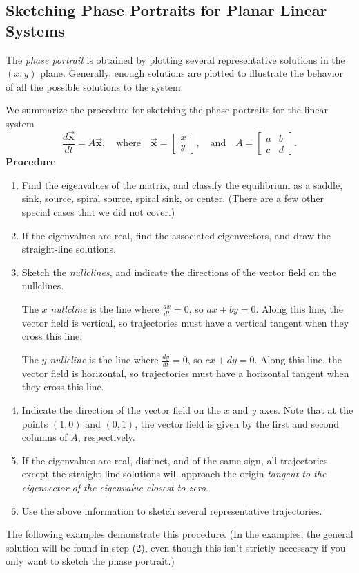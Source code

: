 \documentclass[reqno]{immbook}
\newcommand{\BX}{\vec{\textbf{x}}}
\numberwithin{equation}{chapter}
\numberwithin{question}{section}
\numberwithin{theorem}{chapter}
\numberwithin{figure}{chapter}
\theoremstyle{definition}
\begin{document}
\subsection*{Sketching Phase Portraits for Planar Linear Systems}

\noindent
The \emph{phase portrait} is obtained by plotting several
representative solutions in the $(x,y)$ plane.
Generally, enough solutions are plotted to illustrate
the behavior of all the possible solutions to the system.

We summarize the procedure for sketching the phase portraits for
the linear system
\[
    \frac{d\BX}{dt} = A\BX, \quad \textrm{where} \quad
    \BX=\begin{bmatrix} x \\ y \end{bmatrix},
    \quad \textrm{and} \quad
    A = \begin{bmatrix} a & b \\ c & d \end{bmatrix}.
\]
\noindent
\textbf{Procedure}
\begin{enumerate}
\item
Find the eigenvalues of the matrix, and classify the equilibrium as a
saddle, sink, source, spiral source, spiral sink, or center.
(There are a few other special cases that we did not cover.)
\item
If the eigenvalues are real, find the associated eigenvectors, and
draw the straight-line solutions.
\item  Sketch the \emph{nullclines}, and indicate the
directions of the vector field on the nullclines.

The $x$ \emph{nullcline} is the line where $\frac{dx}{dt}=0$,
so $ax+by=0$. Along this line, the vector field is vertical, so trajectories
must have a vertical tangent when they cross this line.

The $y$ \emph{nullcline} is the line where $\frac{dy}{dt}=0$, so
$cx+dy=0$.  Along this line, the vector field is horizontal, so
trajectories must have a horizontal tangent when they cross this line.
 
\item Indicate the direction of the vector field on the $x$ and $y$ axes.
Note that at the points $(1,0)$ and $(0,1)$, the
vector field is given by the first and second columns of $A$, respectively.
\item
If the eigenvalues are real, distinct, and of the same sign,
all trajectories except the straight-line solutions
will approach the origin \emph{tangent to the eigenvector
of the eigenvalue closest to zero}.
\item Use the above information to sketch several representative trajectories.
\end{enumerate}
The following examples demonstrate this procedure.
(In the examples, the general solution will be found in step (2),
even though this isn't strictly necessary if you only want to
sketch the phase portrait.)
\newpage
\end{document}
